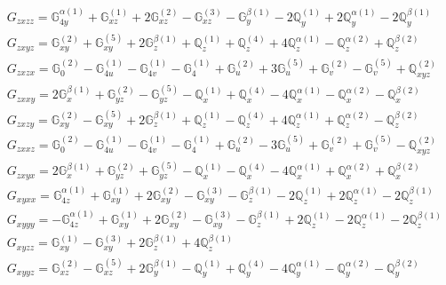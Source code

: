 \documentclass[fleqn,8pt,landscape]{jsarticle}
\begin{document}
\begin{align*}
& G_{zxzz} = \mathbb{G}_{4y}^{\alpha(1)} + \mathbb{G}_{xz}^{(1)} + 2 \mathbb{G}_{xz}^{(2)} - \mathbb{G}_{xz}^{(3)} - \mathbb{G}_{y}^{\beta(1)} - 2 \mathbb{Q}_{y}^{(1)} + 2 \mathbb{Q}_{y}^{\alpha(1)} - 2 \mathbb{Q}_{y}^{\beta(1)} \\
& G_{zxyz} = \mathbb{G}_{xy}^{(2)} + \mathbb{G}_{xy}^{(5)} + 2 \mathbb{G}_{z}^{\beta(1)} + \mathbb{Q}_{z}^{(1)} + \mathbb{Q}_{z}^{(4)} + 4 \mathbb{Q}_{z}^{\alpha(1)} - \mathbb{Q}_{z}^{\alpha(2)} + \mathbb{Q}_{z}^{\beta(2)} \\
& G_{zxzx} = \mathbb{G}_{0}^{(2)} - \mathbb{G}_{4u}^{(1)} - \mathbb{G}_{4v}^{(1)} - \mathbb{G}_{4}^{(1)} + \mathbb{G}_{u}^{(2)} + 3 \mathbb{G}_{u}^{(5)} + \mathbb{G}_{v}^{(2)} - \mathbb{G}_{v}^{(5)} + \mathbb{Q}_{xyz}^{(2)} \\
& G_{zxxy} = 2 \mathbb{G}_{x}^{\beta(1)} + \mathbb{G}_{yz}^{(2)} - \mathbb{G}_{yz}^{(5)} - \mathbb{Q}_{x}^{(1)} + \mathbb{Q}_{x}^{(4)} - 4 \mathbb{Q}_{x}^{\alpha(1)} - \mathbb{Q}_{x}^{\alpha(2)} - \mathbb{Q}_{x}^{\beta(2)} \\
& G_{zxzy} = \mathbb{G}_{xy}^{(2)} - \mathbb{G}_{xy}^{(5)} + 2 \mathbb{G}_{z}^{\beta(1)} + \mathbb{Q}_{z}^{(1)} - \mathbb{Q}_{z}^{(4)} + 4 \mathbb{Q}_{z}^{\alpha(1)} + \mathbb{Q}_{z}^{\alpha(2)} - \mathbb{Q}_{z}^{\beta(2)} \\
& G_{zxxz} = \mathbb{G}_{0}^{(2)} - \mathbb{G}_{4u}^{(1)} - \mathbb{G}_{4v}^{(1)} - \mathbb{G}_{4}^{(1)} + \mathbb{G}_{u}^{(2)} - 3 \mathbb{G}_{u}^{(5)} + \mathbb{G}_{v}^{(2)} + \mathbb{G}_{v}^{(5)} - \mathbb{Q}_{xyz}^{(2)} \\
& G_{zxyx} = 2 \mathbb{G}_{x}^{\beta(1)} + \mathbb{G}_{yz}^{(2)} + \mathbb{G}_{yz}^{(5)} - \mathbb{Q}_{x}^{(1)} - \mathbb{Q}_{x}^{(4)} - 4 \mathbb{Q}_{x}^{\alpha(1)} + \mathbb{Q}_{x}^{\alpha(2)} + \mathbb{Q}_{x}^{\beta(2)} \\
& G_{xyxx} = \mathbb{G}_{4z}^{\alpha(1)} + \mathbb{G}_{xy}^{(1)} + 2 \mathbb{G}_{xy}^{(2)} - \mathbb{G}_{xy}^{(3)} - \mathbb{G}_{z}^{\beta(1)} - 2 \mathbb{Q}_{z}^{(1)} + 2 \mathbb{Q}_{z}^{\alpha(1)} - 2 \mathbb{Q}_{z}^{\beta(1)} \\
& G_{xyyy} = - \mathbb{G}_{4z}^{\alpha(1)} + \mathbb{G}_{xy}^{(1)} + 2 \mathbb{G}_{xy}^{(2)} - \mathbb{G}_{xy}^{(3)} - \mathbb{G}_{z}^{\beta(1)} + 2 \mathbb{Q}_{z}^{(1)} - 2 \mathbb{Q}_{z}^{\alpha(1)} - 2 \mathbb{Q}_{z}^{\beta(1)} \\
& G_{xyzz} = \mathbb{G}_{xy}^{(1)} - \mathbb{G}_{xy}^{(3)} + 2 \mathbb{G}_{z}^{\beta(1)} + 4 \mathbb{Q}_{z}^{\beta(1)} \\
& G_{xyyz} = \mathbb{G}_{xz}^{(2)} - \mathbb{G}_{xz}^{(5)} + 2 \mathbb{G}_{y}^{\beta(1)} - \mathbb{Q}_{y}^{(1)} + \mathbb{Q}_{y}^{(4)} - 4 \mathbb{Q}_{y}^{\alpha(1)} - \mathbb{Q}_{y}^{\alpha(2)} - \mathbb{Q}_{y}^{\beta(2)} \\

\end{align*}
\end{document}

